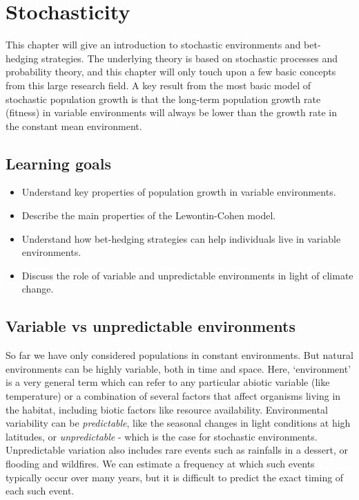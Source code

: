 \documentclass[
]{book}
\begin{document}
\hypertarget{Stochasticity}{%
\chapter{Stochasticity}\label{Stochasticity}}

This chapter will give an introduction to stochastic environments and bet-hedging strategies. The underlying theory is based on stochastic processes and probability theory, and this chapter will only touch upon a few basic concepts from this large research field. A key result from the most basic model of stochastic population growth is that the long-term population growth rate (fitness) in variable environments will always be lower than the growth rate in the constant mean environment.

\hypertarget{learning-goals-4}{%
\section{Learning goals}\label{learning-goals-4}}

\begin{itemize}
\item
  Understand key properties of population growth in variable environments.
\item
  Describe the main properties of the Lewontin-Cohen model.
\item
  Understand how bet-hedging strategies can help individuals live in variable environments.
\item
  Discuss the role of variable and unpredictable environments in light of climate change.
\end{itemize}

\hypertarget{variable-vs-unpredictable-environments}{%
\section{Variable vs unpredictable environments}\label{variable-vs-unpredictable-environments}}

So far we have only considered populations in constant environments. But natural environments can be highly variable, both in time and space. Here, `environment' is a very general term which can refer to any particular abiotic variable (like temperature) or a combination of several factors that affect organisms living in the habitat, including biotic factors like resource availability. Environmental variability can be \emph{predictable}, like the seasonal changes in light conditions at high latitudes, or \emph{unpredictable} - which is the case for stochastic environments. Unpredictable variation also includes rare events such as rainfalls in a dessert, or flooding and wildfires. We can estimate a frequency at which such events typically occur over many years, but it is difficult to predict the exact timing of each such event.
\end{document}
